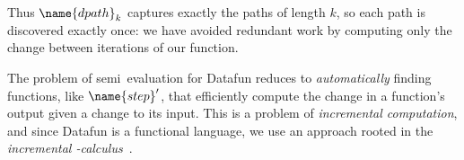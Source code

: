 \noindent
Thus $\name{dpath}_k$ captures exactly the paths of length $k$, so each path is discovered exactly once: we have avoided redundant work by computing only the change between iterations of our  function.

The problem of semi\naive\ evaluation for Datafun reduces to \emph{automatically} finding functions, like $\name{step}'$, that efficiently compute the change in a function's output given a change to its input.
%
This is a problem of \emph{incremental computation}, and since Datafun is a
functional language, we use an approach rooted in the \emph{incremental
  \fn-calculus}~\citep{incremental,DBLP:conf/esop/GiarrussoRS19,DBLP:phd/dnb/Giarrusso20}.







